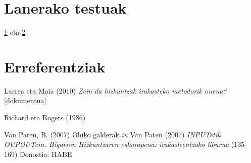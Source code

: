 \documentclass[
]{book}
\begin{document}
\hypertarget{lanerako-testuak}{%
\chapter{Lanerako testuak}\label{lanerako-testuak}}

\href{../assets/MetodorikOnena.pdf}{1} eta \href{../assets/Ohiko_galderak_Van_Patten.pdf}{2}

\hypertarget{erreferentziak-1}{%
\chapter{Erreferentziak}\label{erreferentziak-1}}

Larrea eta Maia (2010) \emph{Zein da hizkuntzak irakasteko metodorik onena?} {[}dokumentua{]}

Richard eta Rogers (1986)

Van Paten, B. (2007) Ohiko galderak \emph{in} Van Paten (2007) \emph{INPUTetik OUPOUTera. Bigarren Hizkuntzaren eskurapena: irakasleentzako liburua} (135-169) Donostia: HABE
\end{document}
